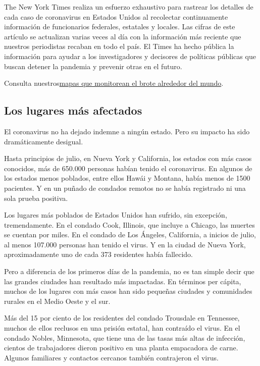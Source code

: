 The New York Times realiza un esfuerzo exhaustivo para rastrear los
detalles de cada caso de coronavirus en Estados Unidos al recolectar
continuamente información de funcionarios federales, estatales y
locales. Las cifras de este artículo se actualizan varias veces al día
con la información más reciente que nuestros periodistas recaban en todo
el país. El Times ha hecho pública la información para ayudar a los
investigadores y decisores de políticas públicas que buscan detener la
pandemia y prevenir otras en el futuro.

Consulta
nuestros\href{https://www.nytimes3xbfgragh.onion/interactive/2020/world/coronavirus-maps.html}{mapas
que monitorean el brote alrededor del mundo}.

\hypertarget{los-lugares-muxe1s-afectados}{%
\subsection{Los lugares más
afectados}\label{los-lugares-muxe1s-afectados}}

El coronavirus no ha dejado indemne a ningún estado. Pero su impacto ha
sido dramáticamente desigual.

Hasta principios de julio, en Nueva York y California, los estados con
más casos conocidos, más de 650.000 personas habían tenido el
coronavirus. En algunos de los estados menos poblados, entre ellos Hawái
y Montana, había menos de 1500 pacientes. Y en un puñado de condados
remotos no se había registrado ni una sola prueba positiva.

Los lugares más poblados de Estados Unidos han sufrido, sin excepción,
tremendamente. En el condado Cook, Illinois, que incluye a Chicago, las
muertes se cuentan por miles. En el condado de Los Ángeles, California,
a inicios de julio, al menos 107.000 personas han tenido el virus. Y en
la ciudad de Nueva York, aproximadamente uno de cada 373 residentes
había fallecido.

Pero a diferencia de los primeros días de la pandemia, no es tan simple
decir que las grandes ciudades han resultado más impactadas. En términos
per cápita, muchos de los lugares con más casos han sido pequeñas
ciudades y comunidades rurales en el Medio Oeste y el sur.

Más del 15 por ciento de los residentes del condado Trousdale en
Tennessee, muchos de ellos reclusos en una prisión estatal, han
contraído el virus. En el condado Nobles, Minnesota, que tiene una de
las tasas más altas de infección, cientos de trabajadores dieron
positivo en una planta empacadora de carne. Algunos familiares y
contactos cercanos también contrajeron el virus.

